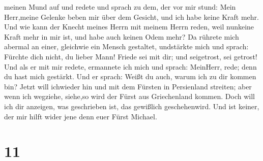 meinen Mund auf und redete und sprach zu dem, der vor mir stund: Mein
Herr,meine Gelenke beben mir über dem Gesicht, und ich habe keine Kraft
mehr.  Und wie kann der Knecht meines Herrn mit meinem
Herrn reden, weil nunkeine Kraft mehr in mir ist, und habe auch keinen
Odem mehr?  Da rührete mich abermal an einer, gleichwie ein
Mensch gestaltet, undstärkte mich  und sprach: Fürchte dich
nicht, du lieber Mann! Friede sei mit dir; und seigetrost, sei getrost!
Und als er mit mir redete, ermannete ich mich und sprach: MeinHerr,
rede; denn du hast mich gestärkt.  Und er sprach: Weißt du
auch, warum ich zu dir kommen bin? Jetzt will ichwieder hin und mit dem
Fürsten in Persienland streiten; aber wenn ich wegziehe, siehe,so wird
der Fürst aus Griechenland kommen.  Doch will ich dir
anzeigen, was geschrieben ist, das gewißlich geschehenwird. Und ist
keiner, der mir hilft wider jene denn euer Fürst Michael.

\hypertarget{section-10}{%
\section{11}\label{section-10}}


